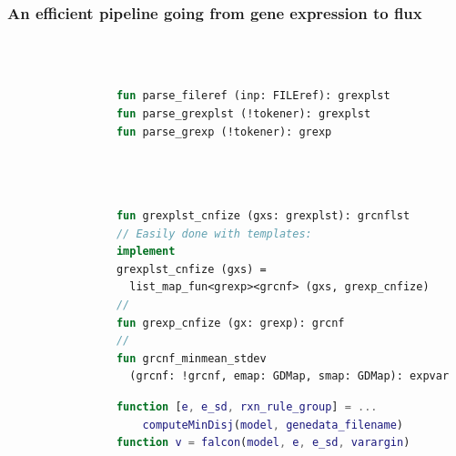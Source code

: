 \documentclass[compress]{beamer}
\newcommand*{\commonDir}{./common/}%
\begin{document}
\begin{frame}[fragile]
\frametitle{An efficient pipeline going from gene expression to flux}

\begin{columns}
\begin{column}{0.45\textwidth}
\begin{figure}
\centering
\end{figure}
\end{column}

\begin{column}{0.55\textwidth}

{\color{gray!65}

{
\begin{lstlisting}[basicstyle=\ttfamily\tiny, language=ATS, showstringspaces=false]


fun parse_fileref (inp: FILEref): grexplst
fun parse_grexplst (!tokener): grexplst
fun parse_grexp (!tokener): grexp


\end{lstlisting}}

{
\begin{lstlisting}[basicstyle=\ttfamily\tiny, language=ATS, showstringspaces=false]



fun grexplst_cnfize (gxs: grexplst): grcnflst
// Easily done with templates:
implement
grexplst_cnfize (gxs) =
  list_map_fun<grexp><grcnf> (gxs, grexp_cnfize)
//
fun grexp_cnfize (gx: grexp): grcnf
//
fun grcnf_minmean_stdev
  (grcnf: !grcnf, emap: GDMap, smap: GDMap): expvar
\end{lstlisting}}

\vspace{4ex}

{
\begin{lstlisting}[basicstyle=\ttfamily\tiny, language=MATLAB, showstringspaces=false]
function [e, e_sd, rxn_rule_group] = ...
    computeMinDisj(model, genedata_filename)
function v = falcon(model, e, e_sd, varargin)
\end{lstlisting}}

} %
\end{column}

\end{columns}

\end{frame}
\end{document}
